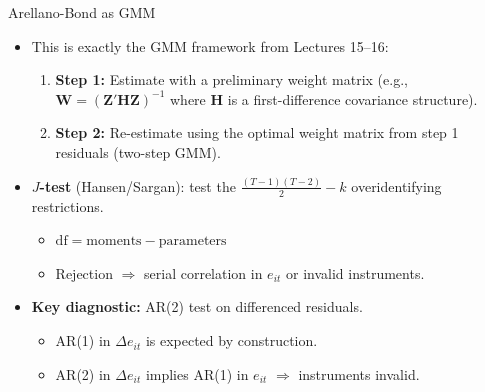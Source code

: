 \documentclass[aspectratio=169, handout, t]{beamer}
\numberwithin{equation}{section}
\begin{document}
\begin{frame}{Arellano-Bond as GMM}
\begin{itemize}
\item This is exactly the GMM framework from Lectures 15--16:\pause
\begin{enumerate}
\item \textbf{Step 1:} Estimate with a preliminary weight matrix (e.g., $\bm{W}=(\bm{Z}'\bm{H}\bm{Z})^{-1}$ where $\bm{H}$ is a first-difference covariance structure).
\item \textbf{Step 2:} Re-estimate using the optimal weight matrix from step 1 residuals (two-step GMM).
\end{enumerate}\pause
\item \textbf{$J$-test} (Hansen/Sargan): test the $\frac{(T-1)(T-2)}{2}-k$ overidentifying restrictions.
\begin{itemize}
\item $\text{df}=\text{moments}-\text{parameters}$
\item Rejection $\Rightarrow$ serial correlation in $e_{it}$ or invalid instruments.
\end{itemize}\pause
\item \textbf{Key diagnostic:} AR(2) test on differenced residuals.
\begin{itemize}
\item AR(1) in $\Delta e_{it}$ is expected by construction.
\item AR(2) in $\Delta e_{it}$ implies AR(1) in $e_{it}$ $\Rightarrow$ instruments invalid.
\end{itemize}
\end{itemize}
\end{frame}
\end{document}
